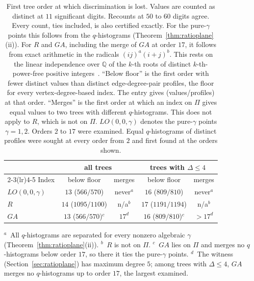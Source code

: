 \documentclass[a5paper, 10pt]{article}
\theoremstyle{plain}
\theoremstyle{remark}
\theoremstyle{definition}
\begin{document}
\begin{table}[htbp]
\centering
\caption{First tree order at which discrimination is lost. Values are
counted as distinct at $11$ significant digits. Recounts at $50$ to $60$ digits agree. Every count, ties included, is also certified exactly. For the pure-$\gamma$ points this follows from the $q$-histograms (Theorem~\ref{thm:ratioplane}(ii)). For $R$ and $GA$, including the merge of $GA$ at order $17$, it follows from exact arithmetic in the radicals $(ij)^{a}(i+j)^{b}$. This rests on the linear independence over $\mathbb{Q}$ of the $k$-th roots of distinct $k$-th-power-free positive integers~\cite{Besicovitch1940}. ``Below
floor'' is the first order with fewer distinct values than distinct
edge-degree-pair profiles, the floor for every vertex-degree-based
index. The entry gives (values/profiles) at that order. ``Merges'' is
the first order at which an index on $\Pi$ gives equal values to two
trees with different $q$-histograms. This does not apply to $R$, which
is not on $\Pi$. $LO(0,0,\gamma)$ denotes the pure-$\gamma$ points
$\gamma = 1, 2$. Orders $2$ to $17$ were examined. Equal $q$-histograms of distinct profiles were sought at every order from $2$ and first found at the orders shown.}
\label{tab:firstfail}
\small
\setlength{\tabcolsep}{3pt}
\begin{tabular}{lcccc}
\toprule
 & \multicolumn{2}{c}{all trees} & \multicolumn{2}{c}{trees with $\Delta \le 4$}\\
\cmidrule(lr){2-3}\cmidrule(lr){4-5}
Index & below floor & merges & below floor & merges\\
\midrule
$LO(0,0,\gamma)$ & $13$ ($566/570$) & never$^{a}$ & $16$ ($809/810$) & never$^{a}$\\
$R$ & $14$ ($1095/1100$) & n/a$^{b}$ & $17$ ($1191/1194$) & n/a$^{b}$\\
$GA$ & $13$ ($566/570$)$^{c}$ & $17^{d}$ & $16$ ($809/810$)$^{c}$ & $> 17^{d}$\\
\bottomrule
\end{tabular}

\smallskip
\begin{minipage}{0.95\linewidth}\footnotesize
$^{a}$~All $q$-histograms are separated for every nonzero algebraic
$\gamma$ (Theorem~\ref{thm:ratioplane}(ii)). $^{b}$~$R$ is not on $\Pi$.
$^{c}$~$GA$ lies on $\Pi$
and merges no $q$-histograms below order $17$, so there it ties the
pure-$\gamma$ points. $^{d}$~The witness (Section~\ref{sec:ratioplane}) has maximum degree $5$; among trees with $\Delta \le 4$, $GA$ merges no $q$-histograms up to order $17$, the largest examined.
\end{minipage}
\end{table}
\end{document}
